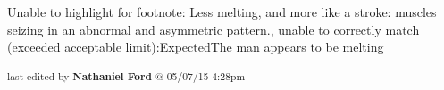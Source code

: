 	Unable to highlight for footnote: Less melting, and more like a stroke: muscles seizing in an abnormal and asymmetric pattern., unable to correctly match (exceeded acceptable limit):ExpectedThe man appears to be melting


\fi

\vspace{\fill}

\begin{flushright}
\textsubscript{last edited by \textbf{Nathaniel Ford} @ 05/07/15 4:28pm}
\end{flushright}

